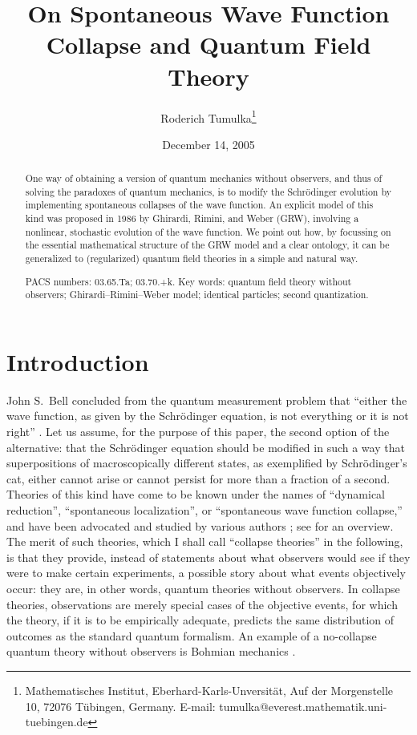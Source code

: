 \documentclass[12pt]{article}
\title{On Spontaneous Wave Function Collapse and
       Quantum Field Theory}
\author{ 
Roderich Tumulka\footnote{Mathematisches Institut,
    Eberhard-Karls-Unversit\"at, Auf der Morgenstelle 10, 72076
    T\"ubingen, Germany.  E-mail:
    tumulka@everest.mathematik.uni-tuebingen.de}
}
\date{December 14, 2005}
\newcommand{\1}{1}
\begin{document}
\maketitle\sloppy
\begin{abstract}
One way of obtaining a version of quantum mechanics without observers, and thus of solving the paradoxes of quantum mechanics, is to modify the Schr\"odinger evolution by implementing spontaneous collapses of the wave function. An explicit model of this kind was proposed in 1986 by Ghirardi, Rimini, and Weber (GRW), involving a nonlinear, stochastic evolution of the wave function. We point out how, by focussing on the essential mathematical structure of the GRW model and a clear ontology, it can be generalized to (regularized) quantum field theories in a simple and natural way.

\medskip

  \noindent PACS numbers:
  03.65.Ta; %
  03.70.+k. %
  Key words: quantum field theory without observers; Ghirardi--Rimini--Weber 
  model; identical particles; second quantization.
\end{abstract}


\section{Introduction}

John S.~Bell concluded from the quantum measurement problem that ``either the wave function, as given by the Schr\"odinger equation, is not everything or it is not right'' \cite{Belljumps}. Let us assume, for the purpose of this paper, the second option of the alternative: that the Schr\"odinger equation should be modified in such a way that superpositions of macroscopically different states, as exemplified by Schr\"odinger's cat, either cannot arise or cannot persist for more than a fraction of a second. Theories of this kind have come to be known under the names of ``dynamical reduction'', ``spontaneous localization'', or ``spontaneous wave function collapse,'' and have been advocated and studied by various authors \cite{BB66,Pe76,Pe79,Gi84,grw, Belljumps, diosi, pearle90, Pen00, adler, leggett, dowker1}; see \cite{BG03} for an overview. The merit of such theories, which I shall call ``collapse theories'' in the following, is that they provide, instead of statements about what observers would see if they were to make certain experiments, a possible story about what events objectively occur: they are, in other words, quantum theories without observers. In collapse theories, observations are merely special cases of the objective events, for which the theory, if it is to be empirically adequate, predicts the same distribution of outcomes as the standard quantum formalism. An example of a no-collapse quantum theory without observers is Bohmian mechanics \cite{DGZ04,Bellbook}.
\end{document}
